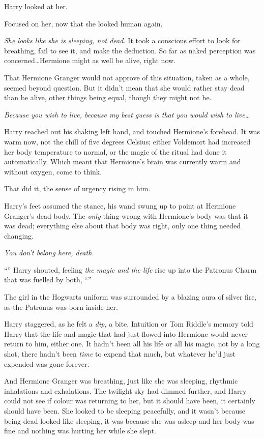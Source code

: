 Harry looked at her.

Focused on her, now that she looked human again.

\emph{She looks like she is sleeping, not dead.} It took a conscious effort to look for breathing, fail to see it, and make the deduction. So far as naked perception was concerned…Hermione might as well be alive, right now.

That Hermione Granger would not approve of this situation, taken as a whole, seemed beyond question. But it didn’t mean that she would rather stay dead than be alive, other things being equal, though they might not be.

\emph{Because you wish to live, because my best guess is that you would wish to live…}

Harry reached out his shaking left hand, and touched Hermione’s forehead. It was warm now, not the chill of five degrees Celsius; either Voldemort had increased her body temperature to normal, or the magic of the ritual had done it automatically. Which meant that Hermione’s brain was currently warm and without oxygen, come to think.

That did it, the sense of urgency rising in him.

Harry’s feet assumed the stance, his wand swung up to point at Hermione Granger’s dead body. The \emph{only} thing wrong with Hermione’s body was that it was dead; everything else about that body was right, only one thing needed changing.

\emph{You don’t belong here, death.}

“” Harry shouted, feeling \emph{the magic and the life} rise up into the Patronus Charm that was fuelled by both, “”

The girl in the Hogwarts uniform was surrounded by a blazing aura of silver fire, as the Patronus was born inside her.

Harry staggered, as he felt a \emph{dip,} a bite. Intuition or Tom Riddle’s memory told Harry that the life and magic that had just flowed into Hermione would never return to him, either one. It hadn’t been all his life or all his magic, not by a long shot, there hadn’t been \emph{time} to expend that much, but whatever he’d just expended was gone forever.

And Hermione Granger was breathing, just like she was sleeping, rhythmic inhalations and exhalations. The twilight sky had dimmed further, and Harry could not see if colour was returning to her, but it should have been, it certainly should have been. She looked to be sleeping peacefully, and it wasn’t because being dead looked like sleeping, it was because she was asleep and her body was fine and nothing was hurting her while she slept.

